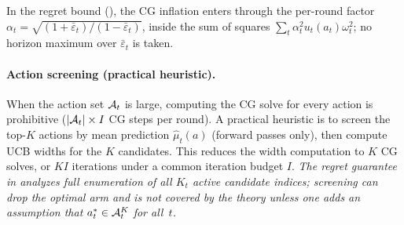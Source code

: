 In the regret bound (), the CG inflation enters through the
per-round factor $\alpha_t = \sqrt{(1{+}\bar\varepsilon_t)/(1{-}\bar\varepsilon_t)}$,
inside the sum of squares $\sum_t\alpha_t^2 u_t(a_t)\omega_t^2$; no horizon
maximum over $\bar\varepsilon_t$ is taken.

\paragraph{Action screening (practical heuristic).}
When the action set $\mathcal{A}_t$ is large, computing the CG solve for every
action is prohibitive ($|\mathcal{A}_t|\times I$ CG steps per round).
A practical heuristic is to screen the top-$K$ actions by mean prediction
$\widehat\mu_t(a)$ (forward passes only), then compute UCB widths for the $K$
candidates.  This reduces the width computation to $K$ CG solves, or $KI$
iterations under a common iteration budget $I$.
\emph{The regret guarantee in  analyzes full enumeration of
all $K_t$ active candidate indices; screening can drop the optimal arm
and is not covered by the theory unless one adds an assumption that
$a_t^*\in\mathcal{A}_t^K$ for all~$t$.}
